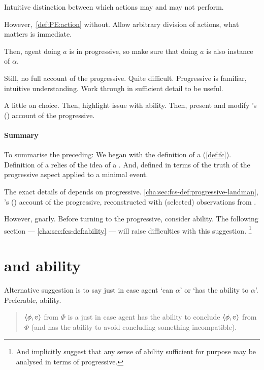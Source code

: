 \begin{note}
  Intuitive distinction between which actions may and may not perform.

  However,~\ref{def:PE:action} without.
  Allow arbitrary division of actions, what matters is immediate.

  Then, agent doing \(a\) is in progressive, so make sure that doing \(a\) is also instance of \(\alpha\).
\end{note}


\begin{note}
  Still, no full account of the progressive.
  Quite difficult.
  Progressive is familiar, intuitive understanding.
  Work through in sufficient detail to be useful.

  A little on choice.
  Then, highlight issue with ability.
  Then, present and modify \citeauthor{Landman:1992wh}'s (\citeyear{Landman:1992wh}) account of the progressive.
\end{note}

\paragraph*{Summary}

\begin{note}[Summarising]
  To summarise the preceding:
  We began with the definition of a \fc{} (\autoref{def:fc}).
  Definition of a \fc{} relies of the idea of a \pevent{}.
  And, defined \pevent{} in terms of the truth of the progressive aspect applied to a minimal event.

  The exact details of \pevent{} depends on progressive.
  \autoref{cha:sec:fcs-def:progressive-landman}, \citeauthor{Landman:1992wh}'s (\citeyear{Landman:1992wh}) account of the progressive, reconstructed with (selected) observations from \textcite{Szabo:2004ul}.

  However, gnarly.
  Before turning to the progressive, consider ability.
  The following section --- \autoref{cha:sec:fcs-def:ability} --- will raise difficulties with this suggestion.%
  \footnote{
    And implicitly suggest that any sense of ability sufficient for purpose may be analysed in terms of progressive.
  }
\end{note}

\section{ and ability}
\label{cha:sec:fcs-def:ability}

\begin{note}
  Alternative suggestion is to say \pevent{} just in case agent `can \(\alpha\)' or `has the ability to \(\alpha\)'.
  Preferable, ability.

  \begin{quote}
    \(\langle \phi, v \rangle\) from \(\Phi\) is a \fc{} just in case agent has the ability to conclude \(\langle \phi, v \rangle\) from \(\Phi\) (and has the ability to avoid concluding something incompatible).
  \end{quote}
\end{note}



